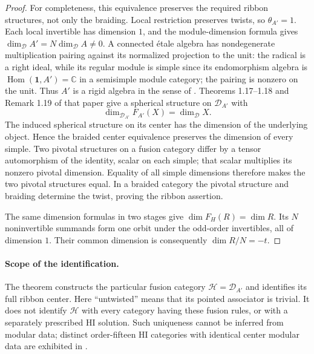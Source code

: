 \documentclass[11pt,a4paper]{article}
\numberwithin{equation}{section}
\theoremstyle{definition}\newtheorem{definition}[theorem]{Definition}
\theoremstyle{remark}\newtheorem{remark}[theorem]{Remark}
\begin{document}
\begin{proof}
For completeness, this equivalence preserves the required ribbon
structures, not only the braiding.
Local restriction preserves twists, so $\theta_{A'}=1$.
Each local invertible has dimension $1$, and the module-dimension
formula gives $\dim_{\mathcal D}A'=N\dim_{\mathcal D}A\ne0$.
A connected \'etale algebra has nondegenerate multiplication pairing
against its normalized projection to the unit: the radical is a
right ideal, while its regular module is simple since its endomorphism
algebra is $\operatorname{Hom}(\mathbf1,A')=\mathbb C$ in a semisimple
module category; the pairing is nonzero on the unit. Thus $A'$ is a
rigid algebra in the sense of \cite[Definition 1.11]{ko}.
Theorems 1.17--1.18 and Remark 1.19 of that paper give a spherical
structure on $\mathcal D_{A'}$ with
\[
 \dim_{\mathcal D_{A'}}F_{A'}(X)=\dim_{\mathcal D}X.
\]
The induced spherical structure on its center has the dimension of
the underlying object. Hence the braided center equivalence preserves
the dimension of every simple. Two pivotal structures on a fusion
category differ by a tensor automorphism of the identity, scalar on
each simple; that scalar multiplies its nonzero pivotal dimension.
Equality of all simple dimensions therefore makes the two pivotal
structures equal. In a braided category the pivotal structure and
braiding determine the twist, proving the ribbon assertion.

The same dimension formulas in two stages give
$\dim F_H(R)=\dim R$. Its $N$ noninvertible summands form one orbit
under the odd-order invertibles, all of dimension $1$. Their common
dimension is consequently $\dim R/N=-t$.
\end{proof}

\paragraph{Scope of the identification.}
The theorem constructs the particular fusion category
$\mathcal H=\mathcal D_{A'}$ and identifies its full ribbon center.
Here ``untwisted'' means that its pointed associator is trivial.
It does not identify $\mathcal H$ with every category having these
fusion rules, or with a separately prescribed HI solution.
Such uniqueness cannot be inferred from modular data; distinct
order-fifteen HI categories with identical center modular data are
exhibited in \cite[Corollary 5.9]{gsy}.
\end{document}
